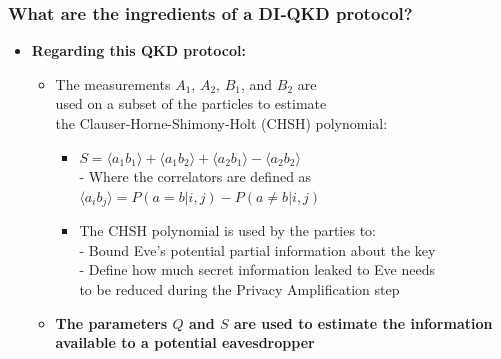 \documentclass{beamer}
\begin{document}
    \begin{frame}
        \frametitle{\large What are the ingredients of a DI‑QKD protocol?}

        \vspace{3ex}
        \begin{itemize}
            \item \textbf{Regarding this QKD protocol:}
            \begin{itemize}
                \item The measurements ${A}_{1}$, ${A}_{2}$, ${B}_{1}$, and ${B}_{2}$ are\\ used on a subset of the particles to estimate\\ the Clauser-Horne-Shimony-Holt (CHSH) polynomial:\\
                \begin{itemize}
                    \small
                    \item $S = \langle {a}_{1} {b}_{1} \rangle + \langle {a}_{1} {b}_{2} \rangle + \langle {a}_{2} {b}_{1} \rangle - \langle {a}_{2} {b}_{2} \rangle$\\
                    \vspace{1ex}
                    - Where the correlators are defined as\\
                    \hspace{0.5em}$\langle {a}_{i} {b}_{j} \rangle = P(a = b | i,j) - P(a \neq b|i,j)$
                    \vspace{0.5em}
                    \small
                    \item The CHSH polynomial is used by the parties to:\\
                    \footnotesize
                    - Bound Eve's potential partial information about the key\\
                    \footnotesize
                    - Define how much secret information leaked to Eve needs\\\hspace{0.5em}to be reduced during the Privacy Amplification step
                \end{itemize}
                \item \textbf{The parameters $Q$ and $S$ are used to estimate the information available to a potential eavesdropper}
            \end{itemize}
        \end{itemize}
    \end{frame}
\end{document}
